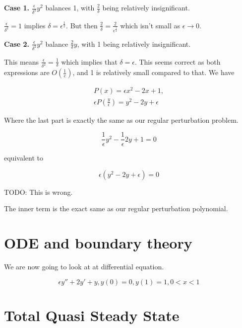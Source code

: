 \documentclass[12pt]{article}
\begin{document}
\textbf{Case 1.} $\frac{\epsilon}{\delta^2} y^2$ balances 1, with $\frac{2}{\delta}$
being relatively insignificant.

$\frac{\epsilon}{\delta^2} = 1$ implies $\delta = \epsilon^{\frac{1}{2}}$. But
then $\frac{2}{\delta} = \frac{2}{\epsilon^{\frac{1}{2}}}$ which isn't small as
$\epsilon \to 0$.

\textbf{Case 2.} $\frac{\epsilon}{\delta^2} y^2$ balance $\frac{2}{\delta} y$,
with 1 being relatively insignificant.

This means $\frac{\epsilon}{\delta^2} = \frac{1}{\delta}$ which implies that
$\delta = \epsilon$. This seems correct as both expressions are
$O(\frac{1}{e})$, and 1 is relatively small compared to that. We have

\begin{align}
P(x) = \epsilon x^2 - 2x + 1, \\
\epsilon P(\frac{y}{\epsilon}) = y^2 - 2 y + \epsilon
\end{align}

Where the last part is exactly the same as our regular perturbation problem.



\begin{equation}
\frac{1}{\epsilon} y^2 - \frac{1}{\epsilon} 2 y + 1 = 0
\end{equation}

equivalent to

\begin{equation}
\epsilon (y^2 - 2y + \epsilon) = 0
\end{equation}

TODO: This is wrong.

The inner term is the exact same as our regular perturbation polynomial.



\section{ODE and boundary theory}

We are now going to look at at differential equation.

\begin{equation}
\epsilon y'' + 2 y' + y, y(0)=0, y(1)=1, 0 <x < 1
\end{equation}

\section{Total Quasi Steady State}
\end{document}
